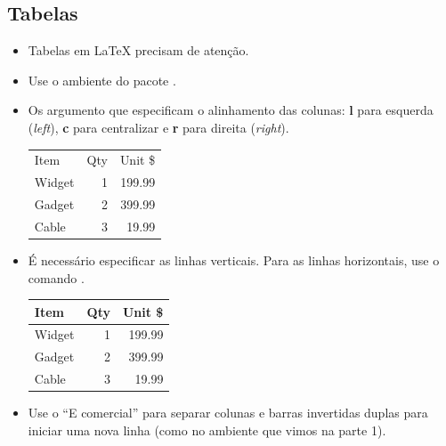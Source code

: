 \documentclass{beamer}
\begin{document}
\subsection{Tabelas}
\begin{frame}[fragile]{\insertsubsection}
\begin{itemize}
\item Tabelas em \LaTeX{} precisam de atenção.
\item Use o ambiente  do pacote .
\item Os argumento que especificam o alinhamento das colunas: \textbf{l} para esquerda (\emph{left}), \textbf{c} para centralizar e \textbf{r} para direita (\emph{right}).
\begin{exampletwouptiny}
\begin{tabular}{lrr}
Item   & Qty & Unit \$ \\
Widget & 1   & 199.99  \\
Gadget & 2   & 399.99  \\
Cable  & 3   & 19.99   \\
\end{tabular}
\end{exampletwouptiny}
\item É necessário especificar as linhas verticais. Para as linhas horizontais,  use o
comando .
\begin{exampletwouptiny}
\begin{tabular}{|l|r|r|} \hline
Item   & Qty & Unit \$ \\\hline
Widget & 1   & 199.99  \\
Gadget & 2   & 399.99  \\
Cable  & 3   & 19.99   \\\hline
\end{tabular}
\end{exampletwouptiny}
\item Use o ``E comercial''  \keystrokebftt{\&} para separar colunas e barras
invertidas duplas \keystrokebftt{\bs}\keystrokebftt{\bs} para iniciar uma nova
linha (como no ambiente   que vimos na parte 1).
\end{itemize}
\end{frame}

\end{document}
